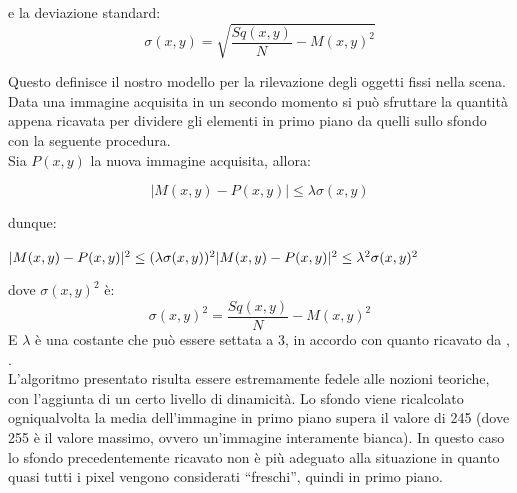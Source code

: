 \documentclass[a4paper,10pt, twocolumn]{article}
\begin{document}
  e la deviazione standard:
  \begin{equation}
   \sigma(x,y) = \sqrt{ \dfrac{Sq(x,y)}{N} - M(x,y)^2}
  \end{equation}
  
  Questo definisce il nostro modello per la rilevazione degli 
  oggetti fissi nella scena. Data una immagine acquisita in un secondo 
  momento si pu\`{o} sfruttare la quantit\`{a} appena ricavata per dividere
  gli elementi in primo piano da quelli sullo sfondo con 
  la seguente procedura.\\
  Sia $P(x,y)$ la nuova immagine acquisita, allora:
  
  \begin{equation}
   | M(x,y) - P(x,y) | \leq \lambda \sigma(x,y)
  \end{equation}
  
  dunque:
  \begin{center}
  $  
   | M(x,y) - P(x,y) |^2 \leq (\lambda \sigma(x,y))^2
    \newline
    \newline
   | M(x,y) - P(x,y) |^2 \leq \lambda^2 \sigma(x,y)^2   
  $ 
  \newline
  
  \end{center}
  dove $\sigma(x,y)^2$ \`{e}:  
  \begin{equation}
  \sigma(x,y)^2 = \dfrac{Sq(x,y)}{N} - M(x,y)^2 
  \end{equation}
  E $\lambda$ \`{e} una costante che pu\`{o} essere settata a 3,
  in accordo con quanto ricavato da \cite{backgroundRemovalDamiles}, \cite{opencvOReally}.\\
  L'algoritmo presentato risulta essere estremamente fedele
  alle nozioni teoriche, con l'aggiunta di un certo livello 
  di dinamicit\`{a}. Lo sfondo viene ricalcolato 
  ogniqualvolta la media dell'immagine in primo piano 
  supera il valore di 245 (dove 255 \`{e} il valore massimo,
  ovvero un'immagine interamente bianca). In questo caso
  lo sfondo precedentemente ricavato non \`{e} pi\`{u}
  adeguato alla situazione in quanto quasi tutti i pixel vengono considerati 
  ``freschi'', quindi in primo piano.
 
 
\end{document}
